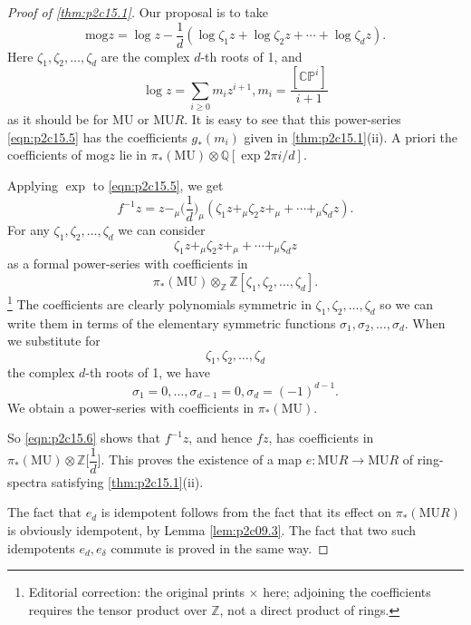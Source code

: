 \documentclass[../main]{subfiles}
\begin{document}
\begin{proof}[Proof of \eqref{thm:p2c15.1}]
Our proposal is to take
\begin{equation}
\label{eqn:p2c15.5}
\tag{15.5}
\mathrm{mog}z=\log z -\dfrac1d(\log\zeta_1z+\log\zeta_2z+\cdots+\log\zeta_dz).
\end{equation}
Here $\zeta_1,\zeta_2,\dots,\zeta_d$ are the complex $d$-th roots of 1, and \[\log z=\sum_{i\geq0}m_iz^{i+1},m_i=\dfrac{[\mathbb{CP}^i]}{i+1}\] as it should be for $\mathrm{MU}$ or $\mathrm{MU}R$. It is easy to see that this power-series \eqref{eqn:p2c15.5} has the coefficients $g_\ast(m_i)$ given in \eqref{thm:p2c15.1}(ii). A priori the coefficients of $\mathrm{mog}z$ lie in $\pi_\ast(\mathrm{MU})\otimes\mathbb{Q}[\exp2\pi i/d]$.

Applying $\exp$ to \eqref{eqn:p2c15.5}, we get 
\begin{equation}
\label{eqn:p2c15.6}
\tag{15.6}
f^{-1}z=z-_\mu\Big(\dfrac1d\Big)_\mu(\zeta_1z+_\mu\zeta_2z+_\mu+\cdots+_\mu\zeta_dz).
\end{equation}
For any $\zeta_1,\zeta_2,\dots,\zeta_d$ we can consider \[\zeta_1z+_\mu\zeta_2z+_\mu+\cdots+_\mu\zeta_dz\] as a formal power-series with coefficients in \[\pi_\ast(\mathrm{MU})\otimes_{\mathbb{Z}}\mathbb{Z}[\zeta_1,\zeta_2,\dots,\zeta_d].\]
\footnote{Editorial correction: the original prints $\times$ here; adjoining the coefficients requires the tensor product over $\mathbb{Z}$, not a direct product of rings.}
The coefficients are clearly polynomials symmetric in $\zeta_1, \zeta_2,\dots,\zeta_d$ so we can write them in terms of the elementary symmetric functions $\sigma_1,\sigma_2,\dots,\sigma_d$. When we substitute for \[\zeta_1,\zeta_2,\dots,\zeta_d\] the complex $d$-th roots of 1, we have \[\sigma_1=0,\dots,\sigma_{d-1}=0,\sigma_d=(-1)^{d-1}.\] We obtain a power-series with coefficients in $\pi_\ast(\mathrm{MU})$.

So \eqref{eqn:p2c15.6} shows that $f^{-1}z$, and hence $fz$, has coefficients in $\pi_\ast(\mathrm{MU})\otimes\mathbb{Z}\Big[\dfrac1d\Big]$. This proves the existence of a map $e:\mathrm{MU}R\longrightarrow\mathrm{MU}R$ of ring-spectra satisfying \eqref{thm:p2c15.1}(ii).

The fact that $e_d$ is idempotent follows from the fact that its effect on $\pi_\ast(\mathrm{MU}R)$ is obviously idempotent, by Lemma \ref{lem:p2c09.3}. The fact that two such idempotents $e_d,e_\delta$ commute is proved in the same way.
\end{proof}
\end{document}
